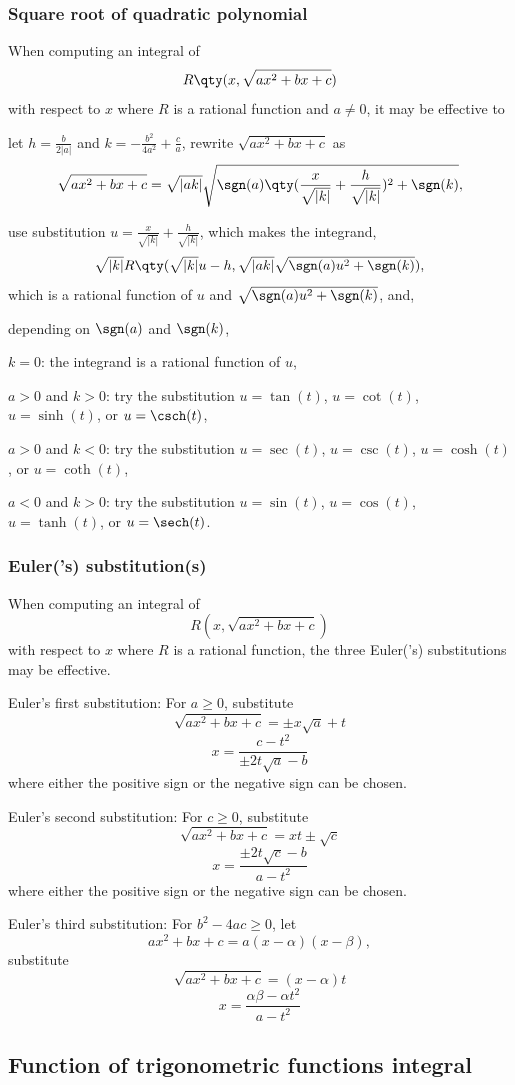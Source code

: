\subsubsection{Square root of quadratic polynomial}
When computing an integral of
\[R\qty(x,\sqrt{ax^2+bx+c})\]
with respect to $x$ where $R$ is a rational function and $a\neq 0$, it may be effective to
\ben
\item let $h=\frac{b}{2|a|}$ and $k=-\frac{b^2}{4a^2}+\frac{c}{a}$, rewrite $\sqrt{ax^2+bx+c}$ as
\[\sqrt{ax^2+bx+c}=\sqrt{|ak|}\sqrt{\sgn(a)\qty(\frac{x}{\sqrt{|k|}}+\frac{h}{\sqrt{|k|}})^2+\sgn(k)},\]
\item use substitution $u=\frac{x}{\sqrt{|k|}}+\frac{h}{\sqrt{|k|}}$, which makes the integrand,
\[\sqrt{|k|}R\qty(\sqrt{|k|}u-h,\sqrt{|ak|}\sqrt{\sgn(a)u^2+\sgn(k)}),\]
which is a rational function of $u$ and $\sqrt{\sgn(a)u^2+\sgn(k)}$, and,
\item depending on $\sgn(a)$ and $\sgn(k)$,
\bit
\item $k=0$: the integrand is a rational function of $u$,
\item $a>0$ and $k>0$: try the substitution $u=\tan(t)$, $u=\cot(t)$, $u=\sinh(t)$, or $u=\csch(t)$,
\item $a>0$ and $k<0$: try the substitution $u=\sec(t)$, $u=\csc(t)$, $u=\cosh(t)$, or $u=\coth(t)$,
\item $a<0$ and $k>0$: try the substitution $u=\sin(t)$, $u=\cos(t)$, $u=\tanh(t)$, or $u=\sech(t)$.
\eit
\een
\subsubsection{Euler('s) substitution(s)}
When computing an integral of
\[R(x,\sqrt{ax^2+bx+c})\]
with respect to $x$ where $R$ is a rational function, the three Euler('s) substitutions may be effective.
\ben
\item Euler's first substitution: For $a\geq 0$, substitute
\[\sqrt{ax^2+bx+c}=\pm x\sqrt{a}+t\]
\[x=\frac{c-t^2}{\pm 2t\sqrt{a}-b}\]
where either the positive sign or the negative sign can be chosen.
\item Euler's second substitution: For $c\geq 0$, substitute
\[\sqrt{ax^2+bx+c}=xt\pm\sqrt{c}\]
\[x=\frac{\pm 2t\sqrt{c}-b}{a-t^2}\]
where either the positive sign or the negative sign can be chosen.
\item Euler's third substitution: For $b^2-4ac\geq 0$, let
\[ax^2+bx+c=a(x-\alpha)(x-\beta),\]
substitute
\[\sqrt{ax^2+bx+c}=(x-\alpha)t\]
\[x=\frac{\alpha\beta-\alpha t^2}{a-t^2}\]
\een
\subsection{Function of trigonometric functions integral}
